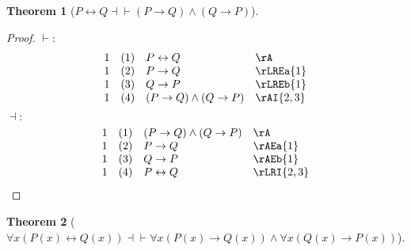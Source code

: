 \documentclass{book}
\theoremstyle{plain}
\newtheorem{theorem}{Theorem}
\theoremstyle{remark}
\theoremstyle{definition}
\begin{document}
\label{PLrQEqvLpPToQRpAndLpQToPRp}
\begin{theorem}[\(P \leftrightarrow Q \dashv \vdash (P \rightarrow Q)\land (Q\rightarrow P)\)]
\end{theorem}
\begin{proof}
	\(\vdash:\)
	\[
	\begin{array}{llll}
		1 & (1) & P\leftrightarrow Q & \rA \\
		1 & (2) & P\rightarrow Q & \rLREa{1} \\
		1 & (3) & Q\rightarrow P & \rLREb{1} \\
		1 & (4) & (P\rightarrow Q)\land (Q\rightarrow P) & \rAI{2,3} \\
	\end{array}
	\]
	\(\dashv:\)
	\[
	\begin{array}{llll}
		1 & (1) & (P\rightarrow Q)\land (Q\rightarrow P) & \rA \\
		1 & (2) & P \rightarrow Q & \rAEa{1} \\
		1 & (3) & Q \rightarrow P & \rAEb{1} \\
		1 & (4) & P \leftrightarrow Q & \rLRI{2,3} \\
	\end{array}
	\]
\end{proof}

\label{FaxLpPLpxRpLrQLpxRpRpEqvFaxLpPLpxRpToQLpxRpRpAndFaxLpQLpxRpToPLpxRpRp}
\begin{theorem}[\(\forall x (P(x) \leftrightarrow Q(x)) \dashv \vdash \forall x (P(x) \rightarrow Q(x)) \land \forall x (Q(x) \rightarrow P(x))\)]
\end{theorem}
\end{document}
